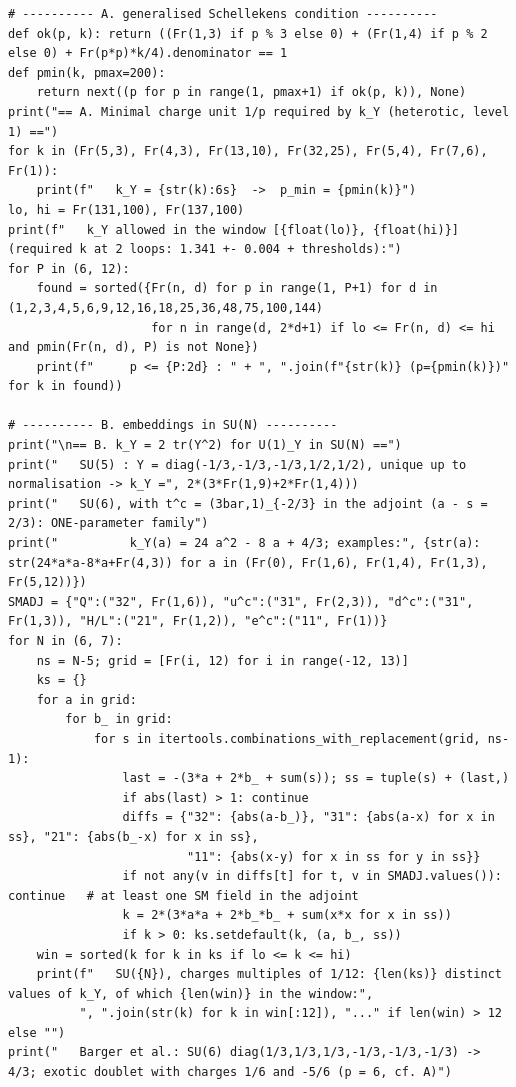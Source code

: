 \documentclass[11pt,a4paper]{article}
\begin{document}
\begin{lstlisting}
# ---------- A. generalised Schellekens condition ----------
def ok(p, k): return ((Fr(1,3) if p % 3 else 0) + (Fr(1,4) if p % 2 else 0) + Fr(p*p)*k/4).denominator == 1
def pmin(k, pmax=200):
    return next((p for p in range(1, pmax+1) if ok(p, k)), None)
print("== A. Minimal charge unit 1/p required by k_Y (heterotic, level 1) ==")
for k in (Fr(5,3), Fr(4,3), Fr(13,10), Fr(32,25), Fr(5,4), Fr(7,6), Fr(1)):
    print(f"   k_Y = {str(k):6s}  ->  p_min = {pmin(k)}")
lo, hi = Fr(131,100), Fr(137,100)
print(f"   k_Y allowed in the window [{float(lo)}, {float(hi)}] (required k at 2 loops: 1.341 +- 0.004 + thresholds):")
for P in (6, 12):
    found = sorted({Fr(n, d) for p in range(1, P+1) for d in (1,2,3,4,5,6,9,12,16,18,25,36,48,75,100,144)
                    for n in range(d, 2*d+1) if lo <= Fr(n, d) <= hi and pmin(Fr(n, d), P) is not None})
    print(f"     p <= {P:2d} : " + ", ".join(f"{str(k)} (p={pmin(k)})" for k in found))

# ---------- B. embeddings in SU(N) ----------
print("\n== B. k_Y = 2 tr(Y^2) for U(1)_Y in SU(N) ==")
print("   SU(5) : Y = diag(-1/3,-1/3,-1/3,1/2,1/2), unique up to normalisation -> k_Y =", 2*(3*Fr(1,9)+2*Fr(1,4)))
print("   SU(6), with t^c = (3bar,1)_{-2/3} in the adjoint (a - s = 2/3): ONE-parameter family")
print("          k_Y(a) = 24 a^2 - 8 a + 4/3; examples:", {str(a): str(24*a*a-8*a+Fr(4,3)) for a in (Fr(0), Fr(1,6), Fr(1,4), Fr(1,3), Fr(5,12))})
SMADJ = {"Q":("32", Fr(1,6)), "u^c":("31", Fr(2,3)), "d^c":("31", Fr(1,3)), "H/L":("21", Fr(1,2)), "e^c":("11", Fr(1))}
for N in (6, 7):
    ns = N-5; grid = [Fr(i, 12) for i in range(-12, 13)]
    ks = {}
    for a in grid:
        for b_ in grid:
            for s in itertools.combinations_with_replacement(grid, ns-1):
                last = -(3*a + 2*b_ + sum(s)); ss = tuple(s) + (last,)
                if abs(last) > 1: continue
                diffs = {"32": {abs(a-b_)}, "31": {abs(a-x) for x in ss}, "21": {abs(b_-x) for x in ss},
                         "11": {abs(x-y) for x in ss for y in ss}}
                if not any(v in diffs[t] for t, v in SMADJ.values()): continue   # at least one SM field in the adjoint
                k = 2*(3*a*a + 2*b_*b_ + sum(x*x for x in ss))
                if k > 0: ks.setdefault(k, (a, b_, ss))
    win = sorted(k for k in ks if lo <= k <= hi)
    print(f"   SU({N}), charges multiples of 1/12: {len(ks)} distinct values of k_Y, of which {len(win)} in the window:",
          ", ".join(str(k) for k in win[:12]), "..." if len(win) > 12 else "")
print("   Barger et al.: SU(6) diag(1/3,1/3,1/3,-1/3,-1/3,-1/3) -> 4/3; exotic doublet with charges 1/6 and -5/6 (p = 6, cf. A)")


\end{lstlisting}
\end{document}
